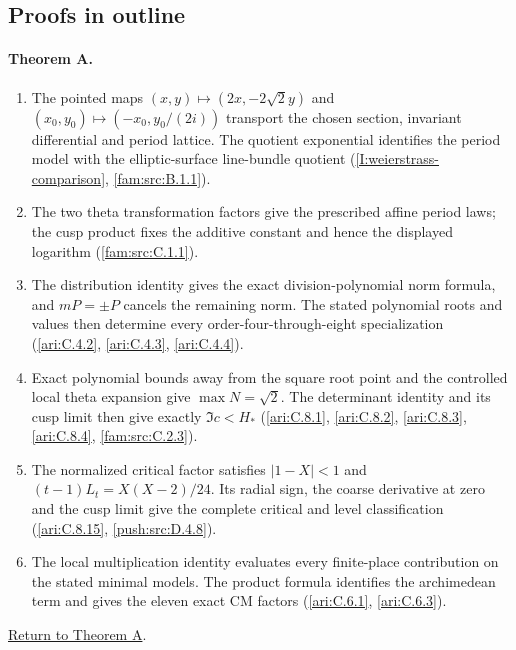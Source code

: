 \documentclass[11pt,a4paper]{article}
\theoremstyle{definition}
\begin{document}
\subsection{Proofs in outline}
\label{series:I:outlines}

\hypertarget{outline-I-A}{}
\paragraph{Theorem A.}
\begin{enumerate}[label=\arabic*.]
\item\hypertarget{step-I-A-1}{} The pointed maps
$(x,y)\mapsto(2x,-2\sqrt2y)$ and
$(x_0,y_0)\mapsto(-x_0,y_0/(2i))$ transport the chosen section,
invariant differential and period lattice.  The quotient
exponential identifies the period model with the elliptic-surface
line-bundle quotient
(\hyperref[I:weierstrass-comparison]{\ref*{I:weierstrass-comparison}},
\hyperref[fam:src:B.1.1]{\ref*{fam:src:B.1.1}}).
\item\hypertarget{step-I-A-2}{} The two theta transformation
factors give the prescribed affine period laws; the cusp product
fixes the additive constant and hence the displayed logarithm
(\hyperref[fam:src:C.1.1]{\ref*{fam:src:C.1.1}}).
\item\hypertarget{step-I-A-3}{} The distribution identity gives
the exact division-polynomial norm formula, and $mP=\pm P$
cancels the remaining norm.  The stated polynomial roots and
values then determine every order-four-through-eight
specialization
(\hyperref[ari:C.4.2]{\ref*{ari:C.4.2}},
\hyperref[ari:C.4.3]{\ref*{ari:C.4.3}},
\hyperref[ari:C.4.4]{\ref*{ari:C.4.4}}).
\item\hypertarget{step-I-A-4}{} Exact polynomial bounds away
from the square root point and the controlled local theta
expansion give $\max N=\sqrt2$.  The determinant identity and
its cusp limit then give exactly $\Im c<H_*$
(\hyperref[ari:C.8.1]{\ref*{ari:C.8.1}},
\hyperref[ari:C.8.2]{\ref*{ari:C.8.2}},
\hyperref[ari:C.8.3]{\ref*{ari:C.8.3}},
\hyperref[ari:C.8.4]{\ref*{ari:C.8.4}},
\hyperref[fam:src:C.2.3]{\ref*{fam:src:C.2.3}}).
\item\hypertarget{step-I-A-5}{} The normalized critical factor
satisfies $|1-X|<1$ and
$(t-1)L_t=X(X-2)/24$.  Its radial sign, the coarse derivative
at zero and the cusp limit give the complete critical and level
classification
(\hyperref[ari:C.8.15]{\ref*{ari:C.8.15}},
\hyperref[push:src:D.4.8]{\ref*{push:src:D.4.8}}).
\item\hypertarget{step-I-A-6}{} The local multiplication identity
evaluates every finite-place contribution on the stated minimal
models.  The product formula identifies the archimedean term and
gives the eleven exact CM factors
(\hyperref[ari:C.6.1]{\ref*{ari:C.6.1}},
\hyperref[ari:C.6.3]{\ref*{ari:C.6.3}}).
\end{enumerate}
\hyperlink{main-I-A}{Return to Theorem A}.
\end{document}
